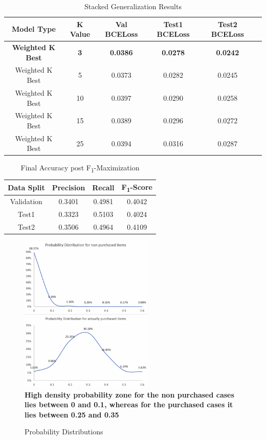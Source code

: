 \begin{table}[t]
\caption{ Stacked Generalization Results}
\vspace{0.1 in}
\centering
\resizebox{3.3in}{!}
{%
\begin{tabular}{|c|c|c|c|c|c|}
\hline
{\bf Model Type} & {\bf K Value} & {\bf Val BCELoss} & {\bf Test1 BCELoss} & {\bf Test2 BCELoss} \\ 
\hline\hline 
{\bf Weighted K Best}	  &  {\bf 3}  &  {\bf 0.0386} &  {\bf 0.0278} &  {\bf 0.0242}  \\ \hline
Weighted K Best	  		&  5  &  0.0373 &  0.0282 &  0.0245  \\ \hline
Weighted K Best	  		 &  10 &  0.0397 &  0.0290 &  0.0258  \\ \hline
Weighted K Best	  		 &  15 &  0.0389 &  0.0296 &  0.0272  \\ \hline
Weighted K Best	  		&  25  &  0.0394 &  0.0316 &  0.0287  \\ \hline
\end{tabular}
}
\label{tab:stacking}
\end{table}

\begin{table}[hbt!]
\caption{Final Accuracy post F\textsubscript{1}-Maximization}
\vspace{0.1 in}
\centering
\resizebox{2.5in}{!}
{%
\begin{tabular}{|c|c|c|c|}
\hline
{\bf Data Split} & {\bf Precision} & {\bf Recall} & {\bf F\textsubscript{1}-Score} \\ 
\hline\hline 
Validation	  	 &  0.3401 &  0.4981 &  0.4042  \\ \hline
Test1	  		 &  0.3323 &  0.5103 &  0.4024  \\ \hline
Test2	  		 & 0.3506 &  0.4964 &  0.4109 \\ \hline
\end{tabular}
}
\label{tab:Fscore}
\end{table}

  \begin{figure}[hbt!]
    \centering 
    \caption{Probability Distributions} 
    \includegraphics[width=2.5in]{img/density.png} 
    \\ {\scriptsize \bf High density probability zone for the non purchased cases lies between 0 and 
    0.1, whereas for the purchased cases it lies between 0.25 and 0.35}
    \label{fig:probdensity} 
  \end{figure}
